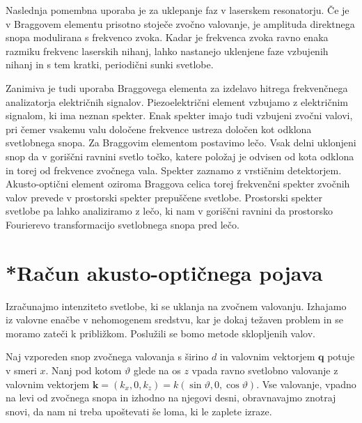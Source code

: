 Naslednja pomembna uporaba je za uklepanje faz
v laserskem resonatorju. Če je v Braggovem elementu prisotno stoječe zvočno
valovanje, je amplituda direktnega snopa modulirana s frekvenco zvoka.
Kadar je frekvenca zvoka ravno enaka razmiku frekvenc laserskih nihanj,
lahko nastanejo uklenjene faze vzbujenih nihanj in s tem kratki, periodični
sunki svetlobe.

Zanimiva je tudi uporaba Braggovega elementa za izdelavo
hitrega frekvenčnega analizatorja električnih signalov.  
Piezoelektrični element vzbujamo z električnim signalom,
ki ima neznan spekter. Enak spekter imajo tudi vzbujeni zvočni valovi, 
pri čemer vsakemu valu določene frekvence ustreza določen kot odklona svetlobnega
snopa. Za Braggovim elementom postavimo lečo. Vsak delni uklonjeni
snop da v goriščni ravnini svetlo točko, katere položaj je odvisen
od kota odklona in torej od frekvence zvočnega vala. Spekter zaznamo
z vrstičnim detektorjem. Akusto-optični element oziroma Braggova celica 
torej frekvenčni spekter zvočnih valov prevede v prostorski
spekter prepuščene svetlobe. Prostorski spekter svetlobe pa lahko
analiziramo z lečo, ki nam v goriščni ravnini da prostorsko
Fourierevo transformacijo svetlobnega snopa pred lečo.

\section{*Račun akusto-optičnega pojava}

Izračunajmo intenziteto svetlobe, ki se uklanja na zvočnem valovanju. Izhajamo 
iz valovne enačbe v nehomogenem sredstvu, kar je dokaj težaven problem
in se moramo zateči k približkom. Poslužili se bomo metode sklopljenih valov. 

Naj vzporeden snop zvočnega valovanja s širino $d$ in valovnim vektorjem $\mathbf{q}$ 
potuje v smeri $x$.
Nanj pod kotom $\vartheta$ glede na os $z$ vpada ravno svetlobno valovanje z valovnim vektorjem 
$\mathbf{k}=(k_{x},0,k_{z})= k(\sin\vartheta,0,\cos\vartheta)$.
Vse valovanje, vpadno na levi od zvočnega snopa in izhodno na njegovi desni,
obravnavajmo znotraj snovi, da nam ni treba upoštevati še loma, ki
le zaplete izraze. 


